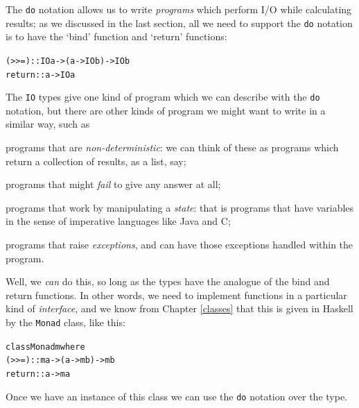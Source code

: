 The \texttt{do} notation allows us to write \emph{programs} which perform I/O while calculating results; as we discussed in the last section, all we need to support the \texttt{do} notation is to have the `bind' function and `return' functions:
\begin{alltt}
(>>=) :: IO a -> (a -> IO b) -> IO b
return :: a -> IO a
\end{alltt} 
The \texttt{IO} types give one kind of program which we can describe with the \texttt{do} notation, but there are other kinds of program we might want to write in a similar way, such as
\begin{titemize}
\item
programs that are \emph{non-deterministic}: we can think of these as programs which return a collection of results, as a list, say;
\item
programs that might \emph{fail} to give any answer at all;
\item
programs that work by manipulating a \emph{state}: that is programs that have variables in the sense of imperative languages like Java and C;
\item
programs that raise \emph{exceptions}, and can have those exceptions handled within the program.
\end{titemize}
Well, we \emph{can} do this, so long as the types have the analogue of the bind and return functions. In other words, we need to implement functions in a particular kind of \emph{interface}, and we know from Chapter \ref{classes} that this is given in Haskell by the \texttt{Monad} class, like this:
\begin{alltt}
class Monad m where
  (>>=)  :: m a -> (a -> m b) -> m b
  return :: a -> m a
\end{alltt}
Once we have an instance of this class we can use the \texttt{do} notation over the type. 

